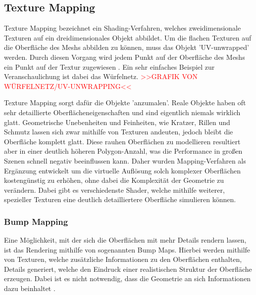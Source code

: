 \subsection{Texture Mapping}

Texture Mapping bezeichnet ein Shading-Verfahren, welches zweidimensionale Texturen auf ein dreidimensionales Objekt
abbildet. Um die flachen Texturen auf die Oberfläche des Meshs abbilden zu können, muss das Objekt 'UV-unwrapped' werden.
Durch diesen Vorgang wird jedem Punkt auf der Oberfläche des Meshs ein Punkt auf der Textur zugewiesen \parencite{Catmull1974} \parencite{Blinn1976}.
Ein sehr einfaches Beispiel zur Veranschaulichung ist dabei das Würfelnetz.
\textcolor{red}{>>GRAFIK VON WÜRFELNETZ/UV-UNWRAPPING<<}

Texture Mapping sorgt dafür die Objekte 'anzumalen'.
Reale Objekte haben oft sehr detaillierte Oberflächeneigenschaften und sind eigentlich niemals wirklich glatt.
Geometrische Unebenheiten und Feinheiten, wie Kratzer, Rillen und Schmutz lassen sich zwar mithilfe von
Texturen andeuten, jedoch bleibt die Oberfläche komplett glatt. Diese rauhen Oberflächen zu modellieren resultiert
aber in einer deutlich höheren Polygon-Anzahl, was die Performance in großen Szenen schnell negativ beeinflussen kann.
Daher wurden Mapping-Verfahren als Ergänzung entwickelt um die virtuelle Auflösung
solch komplexer Oberflächen kostengünstig zu erhöhen, ohne dabei die Komplexität der Geometrie zu verändern.
Dabei gibt es verschiedenste Shader, welche mithilfe weiterer, spezieller Texturen eine deutlich detailliertere
Oberfläche simulieren können.


\subsubsection{Bump Mapping}

Eine Möglichkeit, mit der sich die Oberflächen mit mehr Details rendern lassen, ist das Rendering
mithilfe von sogenannten Bump Maps.
Hierbei werden mithilfe von Texturen, welche zusätzliche Informationen zu den Oberflächen enthalten,
Details generiert, welche den Eindruck einer realistischen Struktur der Oberfläche erzeugen.
Dabei ist es nicht notwendig, dass die Geometrie an sich Informationen dazu beinhaltet \parencite{Blinn1978}.

